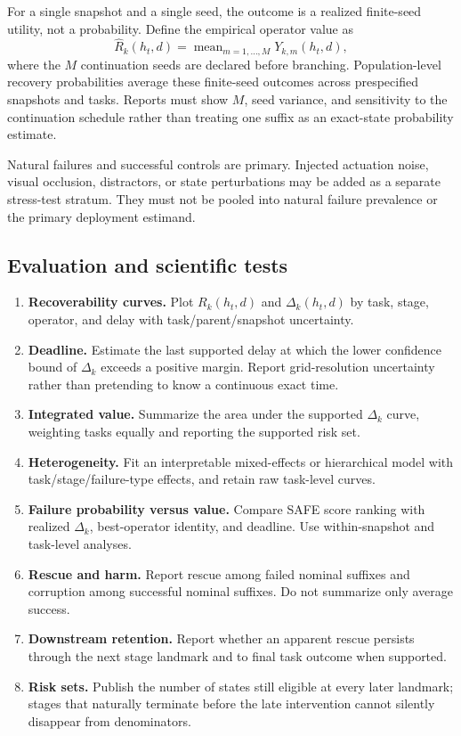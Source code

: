 For a single snapshot and a single seed, the outcome is a realized finite-seed utility, not a probability. Define the empirical operator value as
\begin{equation}
  \hat{R}_k(h_t,d)=\operatorname{mean}_{m=1,\ldots,M}Y_{k,m}(h_t,d),
\end{equation}
where the $M$ continuation seeds are declared before branching. Population-level recovery probabilities average these finite-seed outcomes across prespecified snapshots and tasks. Reports must show $M$, seed variance, and sensitivity to the continuation schedule rather than treating one suffix as an exact-state probability estimate.

Natural failures and successful controls are primary. Injected actuation noise, visual occlusion, distractors, or state perturbations may be added as a separate stress-test stratum. They must not be pooled into natural failure prevalence or the primary deployment estimand.

\subsection{Evaluation and scientific tests}

\begin{enumerate}
  \item \textbf{Recoverability curves.} Plot $R_k(h_t,d)$ and $\Delta_k(h_t,d)$ by task, stage, operator, and delay with task/parent/snapshot uncertainty.
  \item \textbf{Deadline.} Estimate the last supported delay at which the lower confidence bound of $\Delta_k$ exceeds a positive margin. Report grid-resolution uncertainty rather than pretending to know a continuous exact time.
  \item \textbf{Integrated value.} Summarize the area under the supported $\Delta_k$ curve, weighting tasks equally and reporting the supported risk set.
  \item \textbf{Heterogeneity.} Fit an interpretable mixed-effects or hierarchical model with task/stage/failure-type effects, and retain raw task-level curves.
  \item \textbf{Failure probability versus value.} Compare SAFE score ranking with realized $\Delta_k$, best-operator identity, and deadline. Use within-snapshot and task-level analyses.
  \item \textbf{Rescue and harm.} Report rescue among failed nominal suffixes and corruption among successful nominal suffixes. Do not summarize only average success.
  \item \textbf{Downstream retention.} Report whether an apparent rescue persists through the next stage landmark and to final task outcome when supported.
  \item \textbf{Risk sets.} Publish the number of states still eligible at every later landmark; stages that naturally terminate before the late intervention cannot silently disappear from denominators.
\end{enumerate}

